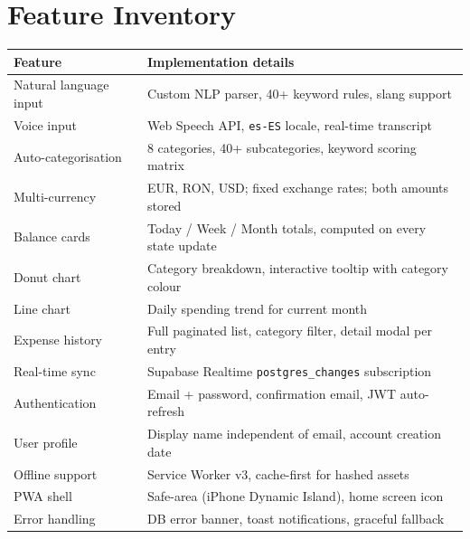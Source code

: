 \documentclass[a4paper,10pt]{article}
\begin{document}
\vspace{4pt}

\section{Feature Inventory}

\begin{tcolorbox}[databox]
{\small
\begin{tabular}{@{}p{4.2cm}p{11.3cm}@{}}
  \toprule
  {\color{ncyan}Feature} & {\color{ncyan}Implementation details} \\
  \midrule
  Natural language input    & Custom NLP parser, 40+ keyword rules, slang support \\
  Voice input               & Web Speech API, \texttt{es-ES} locale, real-time transcript \\
  Auto-categorisation       & 8 categories, 40+ subcategories, keyword scoring matrix \\
  Multi-currency            & EUR, RON, USD; fixed exchange rates; both amounts stored \\
  Balance cards             & Today / Week / Month totals, computed on every state update \\
  Donut chart               & Category breakdown, interactive tooltip with category colour \\
  Line chart                & Daily spending trend for current month \\
  Expense history           & Full paginated list, category filter, detail modal per entry \\
  Real-time sync            & Supabase Realtime \texttt{postgres\_changes} subscription \\
  Authentication            & Email + password, confirmation email, JWT auto-refresh \\
  User profile              & Display name independent of email, account creation date \\
  Offline support           & Service Worker v3, cache-first for hashed assets \\
  PWA shell                 & Safe-area (iPhone Dynamic Island), home screen icon \\
  Error handling            & DB error banner, toast notifications, graceful fallback \\
  \bottomrule
\end{tabular}
}
\end{tcolorbox}

\vspace{4pt}
\end{document}

